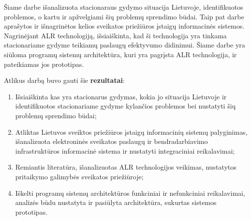 Šiame darbe išanalizuota stacionaraus gydymo situacija Lietuvoje, identifikuotos problemos, o kartu ir apžvelgiami šių problemų sprendimo būdai. Taip pat darbe aprašytos ir išnagrinėtos kelios sveikatos priežiūros įstaigų informacinės sistemos. Nagrinėjant ALR technologiją, išsiaiškinta, kad ši technologija yra tinkama stacionariame gydyme teikiamų paslaugų efektyvumo didinimui. Šiame darbe yra siūloma programų sistemų architektūra, kuri yra pagrįsta ALR technologija, ir pateikiamas jos prototipas.

Atlikus darbą buvo gauti šie \textbf{rezultatai}:
\begin{enumerate}
    \item Išsiaiškinta kas yra stacionarus gydymas, kokia jo situacija Lietuvoje ir identifikuotos stacionariame gydyme kylančios problemos bei nustatyti šių problemų sprendimo būdai;
    \item Atliktas Lietuvos sveiktos priežiūros įstaigų informacinių sistemų palyginimas, išanalizuota elektroninės sveikatos paslaugų ir bendradarbiavimo infrastruktūros informacinė sistema ir nustatyti integraciniai reikalavimai;
    \item Remiantis literatūra, išanalizuotas ALR technologijos veikimas, nustatytos pritaikymo galimybės sveikatos priežiūroje;
    \item Iškelti programų sistemų architektūros funkciniai ir nefunkciniai reikalavimai, analizės būdu nustatyta ir pasiūlyta architektūra, sukurtas sistemos prototipas.
\end{enumerate}

